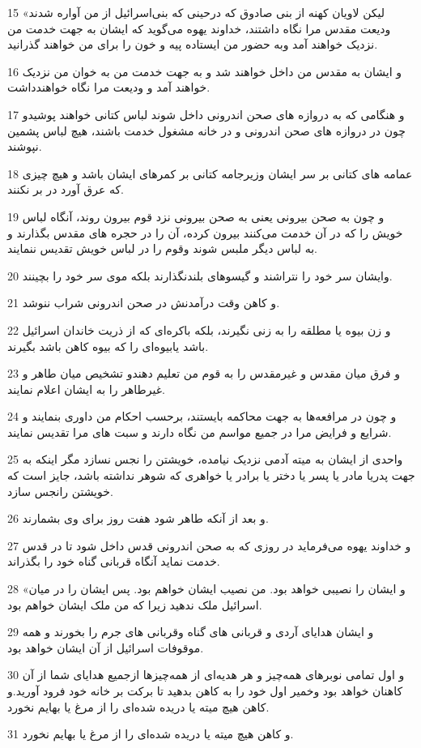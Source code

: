 \par 15 «لیکن لاویان کهنه از بنی صادوق که درحینی که بنی‌اسرائیل از من آواره شدند ودیعت مقدس مرا نگاه داشتند، خداوند یهوه می‌گوید که ایشان به جهت خدمت من نزدیک خواهند آمد وبه حضور من ایستاده پیه و خون را برای من خواهند گذرانید.
\par 16 و ایشان به مقدس من داخل خواهند شد و به جهت خدمت من به خوان من نزدیک خواهند آمد و ودیعت مرا نگاه خواهندداشت.
\par 17 و هنگامی که به دروازه های صحن اندرونی داخل شوند لباس کتانی خواهند پوشیدو چون در دروازه های صحن اندرونی و در خانه مشغول خدمت باشند، هیچ لباس پشمین نپوشند.
\par 18 عمامه های کتانی بر سر ایشان وزیرجامه کتانی بر کمرهای ایشان باشد و هیچ چیزی که عرق آورد در بر نکنند.
\par 19 و چون به صحن بیرونی یعنی به صحن بیرونی نزد قوم بیرون روند، آنگاه لباس خویش را که در آن خدمت می‌کنند بیرون کرده، آن را در حجره های مقدس بگذارند و به لباس دیگر ملبس شوند وقوم را در لباس خویش تقدیس ننمایند.
\par 20 وایشان سر خود را نتراشند و گیسوهای بلندنگذارند بلکه موی سر خود را بچینند.
\par 21 و کاهن وقت درآمدنش در صحن اندرونی شراب ننوشد.
\par 22 و زن بیوه یا مطلقه را به زنی نگیرند، بلکه باکره‌ای که از ذریت خاندان اسرائیل باشد یابیوه‌ای را که بیوه کاهن باشد بگیرند.
\par 23 و فرق میان مقدس و غیرمقدس را به قوم من تعلیم دهندو تشخیص میان طاهر و غیرطاهر را به ایشان اعلام نمایند.
\par 24 و چون در مرافعه‌ها به جهت محاکمه بایستند، بر‌حسب احکام من داوری بنمایند و شرایع و فرایض مرا در جمیع مواسم من نگاه دارند و سبت های مرا تقدیس نمایند.
\par 25 واحدی از ایشان به میته آدمی نزدیک نیامده، خویشتن را نجس نسازد مگر اینکه به جهت پدریا مادر یا پسر یا دختر یا برادر یا خواهری که شوهر نداشته باشد، جایز است که خویشتن رانجس سازد.
\par 26 و بعد از آنکه طاهر شود هفت روز برای وی بشمارند.
\par 27 و خداوند یهوه می‌فرماید در روزی که به صحن اندرونی قدس داخل شود تا در قدس خدمت نماید آنگاه قربانی گناه خود را بگذراند.
\par 28 «و ایشان را نصیبی خواهد بود. من نصیب ایشان خواهم بود. پس ایشان را در میان اسرائیل ملک ندهید زیرا که من ملک ایشان خواهم بود.
\par 29 و ایشان هدایای آردی و قربانی های گناه وقربانی های جرم را بخورند و همه موقوفات اسرائیل از آن ایشان خواهد بود.
\par 30 و اول تمامی نوبرهای همه‌چیز و هر هدیه‌ای از همه‌چیزها ازجمیع هدایای شما از آن کاهنان خواهد بود وخمیر اول خود را به کاهن بدهید تا برکت بر خانه خود فرود آورید.و کاهن هیچ میته یا دریده شده‌ای را از مرغ یا بهایم نخورد.
\par 31 و کاهن هیچ میته یا دریده شده‌ای را از مرغ یا بهایم نخورد.


